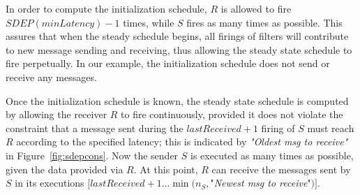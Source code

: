 In order  to compute  the initialization schedule,  $R$ is  allowed to
fire  $SDEP(minLatency)-1$ times,  while $S$  fires as  many  times as
possible.   This assures  that when  the steady  schedule  begins, all
firings  of  filters  will  contribute  to  new  message  sending  and
receiving,   thus  allowing   the  steady   state  schedule   to  fire
perpetually. In our example, the initialization schedule does not send
or receive any messages.

Once the  initialization schedule is  known, the steady state  schedule is
computed by  allowing the receiver $R$ to  fire continuously, provided
it  does not violate  the constraint  that a  message sent  during the
$lastReceived+1$ firing of $S$ must  reach $R$ according to the specified
latency;  this  is indicated  by  {\it  "Oldest  msg to  receive"}  in
Figure~\ref{fig:sdepcons}.  Now the  sender  $S$ is  executed as  many
times as possible, given the data provided via $R$. At this point, $R$
can receive the messages sent  by $S$ in  its executions
$[lastReceived+1  ... \min(n_S,$"{\it Newest msg to receive}"$)]$.

